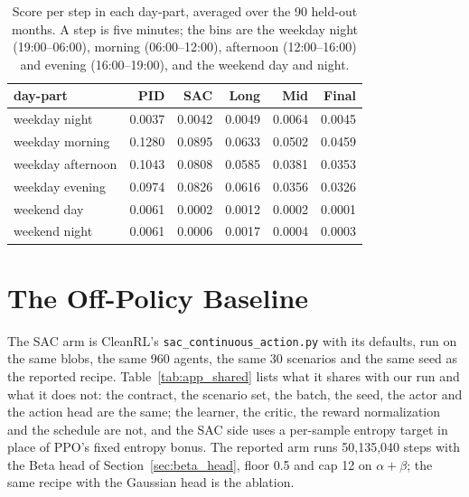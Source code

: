 \documentclass{article}
\begin{document}
\begin{table}[h!]
\centering
\small
\begin{tabular}{@{}lrrrrr@{}}
\toprule
day-part & PID & SAC & Long & Mid & Final \\
\midrule
weekday night & 0.0037 & 0.0042 & 0.0049 & 0.0064 & 0.0045 \\
weekday morning & 0.1280 & 0.0895 & 0.0633 & 0.0502 & 0.0459 \\
weekday afternoon & 0.1043 & 0.0808 & 0.0585 & 0.0381 & 0.0353 \\
weekday evening & 0.0974 & 0.0826 & 0.0616 & 0.0356 & 0.0326 \\
weekend day & 0.0061 & 0.0002 & 0.0012 & 0.0002 & 0.0001 \\
weekend night & 0.0061 & 0.0006 & 0.0017 & 0.0004 & 0.0003 \\
\bottomrule
\end{tabular}
\vspace{4pt}
\caption{Score per step in each day-part, averaged over the 90 held-out months. A step is five
minutes; the bins are the weekday night (19:00--06:00), morning (06:00--12:00), afternoon
(12:00--16:00) and evening (16:00--19:00), and the weekend day and night.}
\label{tab:app_daypart}
\end{table}

\FloatBarrier




\section{The Off-Policy Baseline}
\label{app:sac}

The SAC arm is CleanRL's \texttt{sac\_continuous\_action.py} with its defaults, run on the same blobs, the same 960 agents, the same 30 scenarios and the same seed as the reported recipe. Table~\ref{tab:app_shared} lists what it shares with our run and what it does not: the contract, the scenario set, the batch, the seed, the actor and the action head are the same; the learner, the critic, the reward normalization and the schedule are not, and the SAC side uses a per-sample entropy target in place of PPO's fixed entropy bonus. The reported arm runs 50{,}135{,}040 steps with the Beta head of Section~\ref{sec:beta_head}, floor 0.5 and cap 12 on $\alpha+\beta$; the same recipe with the Gaussian head is the ablation.
\end{document}
